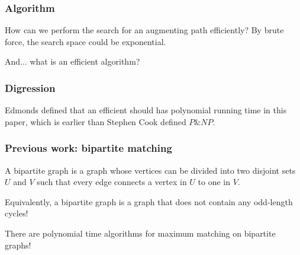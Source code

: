 \documentclass[hyperref={pdfpagelabels=false}]{beamer}
\begin{document}
\frame
{
	\frametitle{Algorithm}

	\large{
	How can we perform the search for an augmenting path \alert{efficiently}? By brute force, the search space could be exponential.
	
	\bigskip
	
	And... what is an efficient algorithm?
	}
}

\frame
{
	\frametitle{Digression}

	\large{
	Edmonds defined that an efficient should has polynomial running time in this paper, which is earlier than Stephen Cook defined $P\&NP$.
		
	}
}

\frame
{
	\frametitle{Previous work: bipartite matching}
	A bipartite graph is a graph whose vertices can be divided into two disjoint sets $U$ and $V$ such that every edge connects a vertex in $U$ to one in $V$.
	
	\bigskip
	
	Equivalently, a bipartite graph is a graph that does \alert{not} contain any \alert{odd-length} cycles!
	
	\bigskip
	
	There are polynomial time algorithms for maximum matching on bipartite graphs!
	
	\begin{center}
	\end{center}
}
\end{document}
